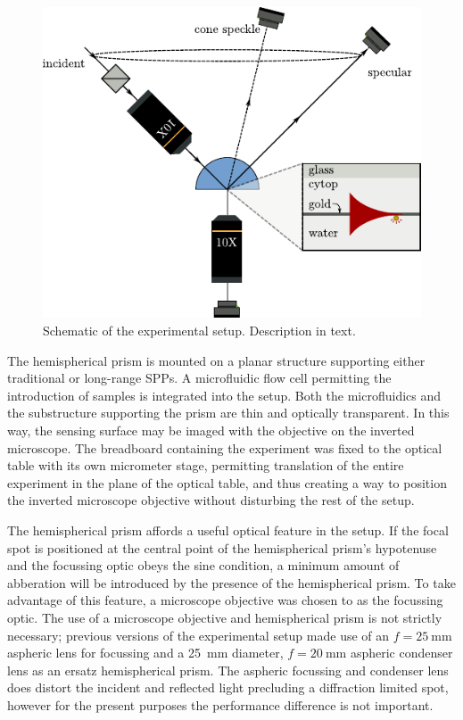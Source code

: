 \begin{figure}[ht]
\centering
 \includegraphics[keepaspectratio]{experimental/figures/conefig.pdf}
 \caption{Schematic of the experimental setup.  Description in text.}
\label{fig:experimentalsetup}
\end{figure}

The hemispherical prism is mounted on a planar structure supporting either
traditional or long-range SPPs.  A microfluidic flow cell permitting the
introduction of samples is integrated into the setup.  Both the microfluidics
and the substructure supporting the prism are thin and optically transparent.
In this way, the sensing surface may be imaged with the objective on the
inverted microscope.  The breadboard containing the experiment was fixed to
the optical table with its own micrometer stage, permitting translation of the
entire experiment in the plane of the optical table, and thus creating a way
to position the inverted microscope objective without disturbing the rest of
the setup.

The hemispherical prism affords a useful optical feature in the setup.  If the
focal spot is positioned at the central point of the hemispherical prism's
hypotenuse and the focussing optic obeys the sine condition, a minimum amount
of abberation will be introduced by the presence of the hemispherical prism.
To take advantage of this feature, a microscope objective was chosen to as the
focussing optic.  The use of a microscope objective and hemispherical prism is
not strictly necessary; previous versions of the experimental setup made use
of an $f=\SI{25}{\milli\meter}$ aspheric lens for focussing and
a \SI{25}{\milli\meter} diameter, $f=\SI{20}{\milli\meter}$ aspheric condenser
lens as an ersatz hemispherical prism.  The aspheric focussing and condenser
lens does distort the incident and reflected light precluding a diffraction
limited spot, however for the present purposes the performance difference is
not important.

